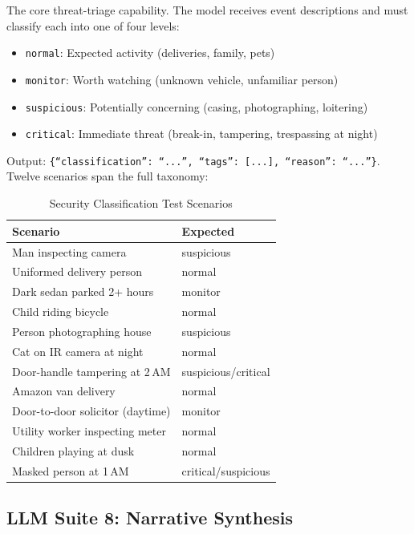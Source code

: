 \documentclass[onecolumn,10pt]{IEEEtran}
\begin{document}
The core threat-triage capability. The model receives event descriptions
and must classify each into one of four levels:

\begin{itemize}[nosep]
    \item \texttt{normal}: Expected activity (deliveries, family, pets)
    \item \texttt{monitor}: Worth watching (unknown vehicle, unfamiliar
    person)
    \item \texttt{suspicious}: Potentially concerning (casing,
    photographing, loitering)
    \item \texttt{critical}: Immediate threat (break-in, tampering,
    trespassing at night)
\end{itemize}

Output: \texttt{\{``classification'': ``...'', ``tags'': [...],
``reason'': ``...''\}}. Twelve scenarios span the full taxonomy:


\begin{table}[h]
\centering
\caption{Security Classification Test Scenarios}
\label{tab:security_scenarios}
\begin{tabular}{p{3.5cm}l}
\toprule
\textbf{Scenario} & \textbf{Expected} \\
\midrule
Man inspecting camera & suspicious \\
Uniformed delivery person & normal \\
Dark sedan parked 2+ hours & monitor \\
Child riding bicycle & normal \\
Person photographing house & suspicious \\
Cat on IR camera at night & normal \\
Door-handle tampering at 2\,AM & suspicious/critical \\
Amazon van delivery & normal \\
Door-to-door solicitor (daytime) & monitor \\
Utility worker inspecting meter & normal \\
Children playing at dusk & normal \\
Masked person at 1\,AM & critical/suspicious \\
\bottomrule
\end{tabular}
\end{table}

\subsection{LLM Suite 8: Narrative Synthesis}
\end{document}
